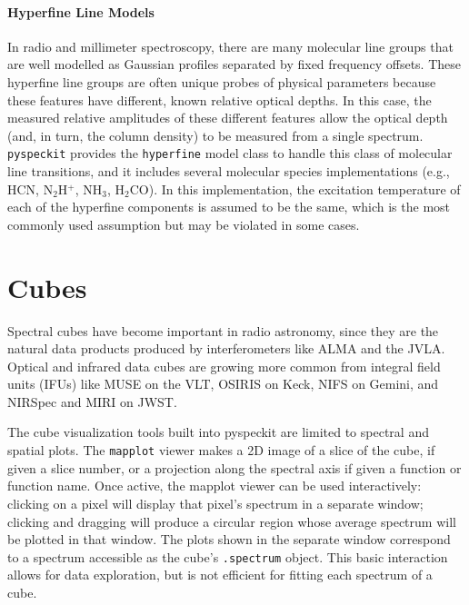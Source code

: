 \documentclass[twocolumn]{aastex63}
\newcommand{\pyspeckit}{\texttt{pyspeckit}\xspace}
\begin{document}
\paragraph{Hyperfine Line Models}
In radio and millimeter spectroscopy, there are many molecular line groups
that are well modelled as Gaussian profiles separated by fixed frequency
offsets.  These hyperfine line groups are often unique probes of physical
parameters because these features have different, known relative optical
depths.  In this case, the measured relative amplitudes of these different
features allow the optical depth (and, in turn, the column density) to be
measured from a single spectrum.  \pyspeckit provides the \texttt{hyperfine}
model class to handle this class of molecular line transitions, and it includes
several molecular species implementations (e.g., HCN, N$_2$H$^+$, NH$_3$, H$_2$CO). 
In this implementation, the excitation temperature of each of the hyperfine components is assumed to be the same, which is the most commonly used assumption but may be violated in some cases.



\section{Cubes}
\label{sec:cubes}
Spectral cubes have become important in radio astronomy, since they are the
natural data products produced by interferometers like ALMA and the JVLA.
Optical and infrared data cubes are growing
more common from integral field units (IFUs) like MUSE on
the VLT, OSIRIS on Keck, NIFS on Gemini, and NIRSpec and MIRI on JWST.

The cube visualization tools built into pyspeckit are limited to spectral and spatial plots.
The \texttt{mapplot} viewer makes a 2D image of a slice of the cube, if given a slice number,
or a projection along the spectral axis if given a function or function name.
Once active, the mapplot viewer can be used interactively: clicking on a pixel
will display that pixel's spectrum in a separate window; clicking and dragging
will produce a circular region whose average spectrum will be plotted in that
window.  The plots shown in the separate window correspond to a spectrum accessible
as the cube's \texttt{.spectrum} object. This basic interaction allows for data exploration,
but is not efficient for fitting each spectrum of a cube.
\end{document}
